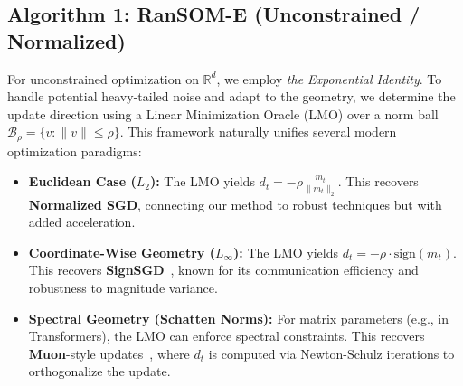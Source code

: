 \documentclass{article}
\theoremstyle{plain}
\theoremstyle{definition}
\theoremstyle{remark}
\begin{document}
\subsection{Algorithm 1: RanSOM-E (Unconstrained / Normalized)}
For unconstrained optimization on $\mathbb{R}^d$, we employ \textit{the Exponential Identity}. To handle potential heavy-tailed noise and adapt to the geometry, we determine the update direction using a Linear Minimization Oracle (LMO) over a norm ball $\mathcal{B}_\rho = \{v : \|v\| \le \rho\}$. This framework naturally unifies several modern optimization paradigms:

\begin{itemize}
    \item \textbf{Euclidean Case ($L_2$):} The LMO yields $d_t = -\rho \frac{m_t}{\|m_t\|_2}$. This recovers \textbf{Normalized SGD}, connecting our method to robust techniques but with added acceleration.
    \item \textbf{Coordinate-Wise Geometry ($L_\infty$):} The LMO yields $d_t = -\rho \cdot \text{sign}(m_t)$. This recovers \textbf{SignSGD}~\cite{bernstein2018signsgd}, known for its communication efficiency and robustness to magnitude variance.
    \item \textbf{Spectral Geometry (Schatten Norms):} For matrix parameters (e.g., in Transformers), the LMO can enforce spectral constraints. This recovers \textbf{Muon}-style updates~\cite{jordan2024muon}, where $d_t$ is computed via Newton-Schulz iterations to orthogonalize the update.
\end{itemize}
\end{document}
